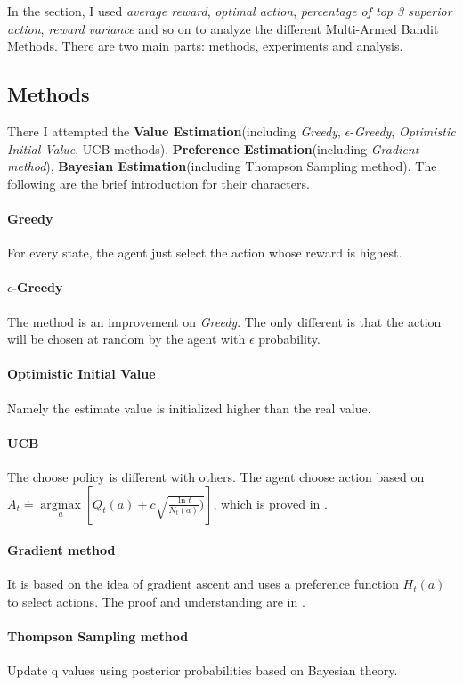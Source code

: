 \documentclass[12pt]{article}
\begin{document}
In the section, I used \textit{average reward}, \textit{optimal action}, \textit{percentage of top 3 superior action}, \textit{reward variance} and so on to analyze the different Multi-Armed Bandit Methods. There are two main parts: methods, experiments and analysis.
\subsection{Methods}
There I attempted the \textbf{Value Estimation}(including \textit{Greedy}, $\epsilon$-\textit{Greedy}, \textit{Optimistic Initial Value}, UCB methods), \textbf{Preference Estimation}(including \textit{Gradient method}), \textbf{Bayesian Estimation}(including Thompson Sampling method). The following are the brief introduction for their characters.

\paragraph*{Greedy} For every state, the agent just select the action whose reward is highest.
\paragraph*{$\epsilon$-Greedy} The method is an improvement on \textit{Greedy}. The only different is that the action will be chosen at random by the agent with $\epsilon$ probability. 
\paragraph*{Optimistic Initial Value}Namely the estimate value is initialized higher than the real value.
\paragraph*{UCB} The choose policy is different with others. The agent choose action based on $A_t \doteq \mathop{argmax}\limits_{a}\left [Q_t(a)+c\sqrt{\frac{\ln{t}}{N_t(a)})}  \right ] $, which is proved in .
\paragraph*{Gradient method} It is based on the idea of gradient ascent and uses a preference function $H_t(a)$ to select actions. The proof and understanding are in .
\paragraph*{Thompson Sampling method} Update q values using posterior probabilities based on Bayesian theory.
\end{document}
